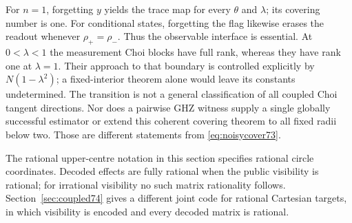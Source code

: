 \begin{remark}\label{rem:noisyscope73}
For $n=1$, forgetting $y$ yields the trace map for every $\theta$ and
$\lambda$; its covering number is one. For conditional states, forgetting
the flag likewise erases the readout whenever $\rho_+=\rho_-$.
Thus the observable interface is essential. At $0<\lambda<1$ the
measurement Choi blocks have full rank, whereas they have rank one at
$\lambda=1$. Their approach to that boundary is controlled explicitly
by $N(1-\lambda^2)$; a fixed-interior theorem alone would leave its
constants undetermined. The transition is not a general classification
of all coupled Choi tangent directions. Nor does a pairwise GHZ witness
supply a single globally successful estimator or extend this coherent
covering theorem to all fixed radii below two. Those are different
statements from \eqref{eq:noisycover73}.
\end{remark}

\begin{remark}
The rational upper-centre notation in this section specifies rational
circle coordinates. Decoded effects are fully rational when the public
visibility is rational; for irrational visibility no such matrix
rationality follows. Section~\ref{sec:coupled74} gives a different joint
code for rational Cartesian targets, in which visibility is encoded
and every decoded matrix is rational.
\end{remark}
